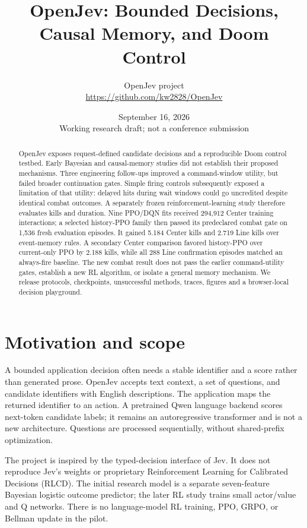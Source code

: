 \documentclass[11pt]{article}
\title{OpenJev: Bounded Decisions, Causal Memory, and Doom Control}
\author{OpenJev project\\\small\url{https://github.com/kw2828/OpenJev}}
\date{September 16, 2026\\\small Working research draft; not a conference submission}
\begin{document}
\maketitle
\begin{abstract}
OpenJev exposes request-defined candidate decisions and a reproducible Doom control testbed. Early Bayesian and causal-memory studies did not establish their proposed mechanisms. Three engineering follow-ups improved a command-window utility, but failed broader continuation gates. Simple firing controls subsequently exposed a limitation of that utility: delayed hits during wait windows could go uncredited despite identical combat outcomes. A separately frozen reinforcement-learning study therefore evaluates kills and duration. Nine PPO/DQN fits received 294,912 Center training interactions; a selected history-PPO family then passed its predeclared combat gate on 1,536 fresh evaluation episodes. It gained 5.184 Center kills and 2.719 Line kills over event-memory rules. A secondary Center comparison favored history-PPO over current-only PPO by 2.188 kills, while all 288 Line confirmation episodes matched an always-fire baseline. The new combat result does not pass the earlier command-utility gates, establish a new RL algorithm, or isolate a general memory mechanism. We release protocols, checkpoints, unsuccessful methods, traces, figures and a browser-local decision playground.
\end{abstract}

\section{Motivation and scope}
A bounded application decision often needs a stable identifier and a score rather than generated prose. OpenJev accepts text context, a set of questions, and candidate identifiers with English descriptions. The application maps the returned identifier to an action. A pretrained Qwen language backend scores next-token candidate labels; it remains an autoregressive transformer and is not a new architecture. Questions are processed sequentially, without shared-prefix optimization.

The project is inspired by the typed-decision interface of Jev. It does not reproduce Jev's weights or proprietary Reinforcement Learning for Calibrated Decisions (RLCD). The initial research model is a separate seven-feature Bayesian logistic outcome predictor; the later RL study trains small actor/value and Q networks. There is no language-model RL training, PPO, GRPO, or Bellman update in the pilot.
\end{document}
